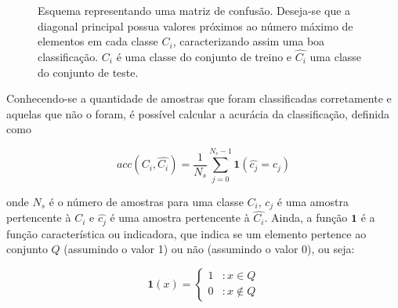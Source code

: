 \begin{figure}[ht!]
\begin{center}
\caption{\label{fig:confusa} Esquema representando uma matriz de
  confusão. Deseja-se que a diagonal principal possua valores próximos
  ao número máximo de elementos em cada classe $C_i$, caracterizando
  assim uma boa classificação. $C_i$ é uma classe do conjunto de
  treino e $\hat{C_i}$ uma classe do conjunto de teste.}

\vspace{15pt}

\vspace{15pt}
\fonteminha
\end{center}
\end{figure}

Conhecendo-se a quantidade de amostras que foram classificadas corretamente e aquelas que não o foram, é possível calcular a acurácia da classificação, definida como

\begin{equation}
  acc(C_i, \hat{C_i}) = \frac{1}{N_s} \sum_{j=0}^{N_s-1} \textbf{1}(\hat{c_j} = c_j)
\end{equation}

\noindent onde $N_s$ é o número de amostras para uma classe $C_i$,
$c_j$ é uma amostra pertencente à $C_i$ e $\hat{c_j}$ é uma amostra
pertencente à $\hat{C_i}$. Ainda, a função $\textbf{1}$ é a função
característica ou indicadora, que indica se um elemento pertence ao
conjunto $Q$ (assumindo o valor 1) ou não (assumindo o valor 0), ou
seja:

\begin{equation}
  \textbf{1}(x) = \left\{
     \begin{array}{lr}
       1 & : x \in Q \\
       0 & : x \notin Q
     \end{array}
   \right.
\end{equation}

